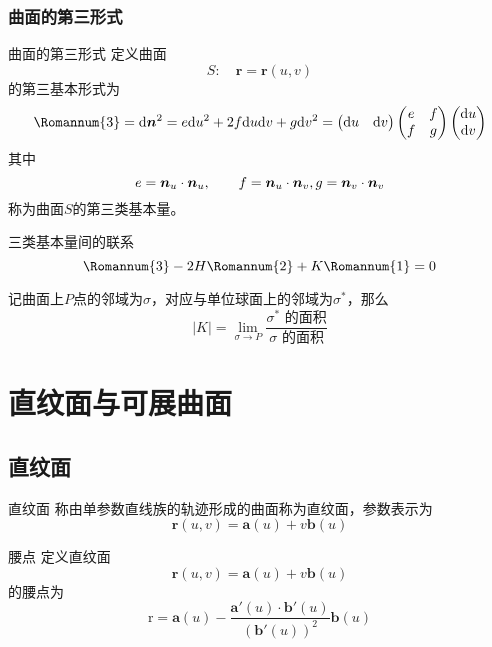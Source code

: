 \documentclass[lang = cn, scheme = chinese, thmcnt = section]{elegantbook}
\newcommand{\bs}{\boldsymbol}          %
\newcommand{\dd}{\mathrm{d}}           %
\begin{document}
\subsubsection{曲面的第三形式}

\begin{definition}{曲面的第三形式}
	定义曲面
	$$
	S:\quad \bs{r}=\bs{r}(u,v)
	$$
	的第三基本形式为%
	$$
	{\rm\Romannum{3}}
	=\dd\bs{n}^2
	=e\dd u^2+2f\dd u\dd v+g\dd v^2=
	\begin{pmatrix}
		\dd u & \dd v
	\end{pmatrix}
	\begin{pmatrix}
		e & f\\
		f & g
	\end{pmatrix}
	\begin{pmatrix}
		\dd u \\ \dd v
	\end{pmatrix}
	$$
	其中%
	$$
	e=\bs{n}_u\cdot\bs{n}_u,\qquad
	f=\bs{n}_u\cdot\bs{n}_v,\qquad \\
	g=\bs{n}_v\cdot\bs{n}_v
	$$
	称为曲面$S$的第三类基本量。
\end{definition}

\begin{theorem}{三类基本量间的联系}
	$$
	{\rm\Romannum{3}}-2H{\rm\Romannum{2}}+K{\rm\Romannum{1}}=0
	$$
\end{theorem}

\begin{proposition}
	记曲面上$P$点的邻域为$\sigma$，对应与单位球面上的邻域为$\sigma^*$，那么%
	$$
	|K|=\lim_{\sigma\to P}\frac{\sigma^*\text{ 的面积}}{\sigma\text{ 的面积}}
	$$
\end{proposition}

\section{直纹面与可展曲面}

\subsection{直纹面}

\begin{definition}{直纹面}
	称由单参数直线族的轨迹形成的曲面称为直纹面，参数表示为%
	$$
	\bs{r}(u,v)=\bs{a}(u)+v\bs{b}(u)
	$$
\end{definition}

\begin{definition}{腰点}
	定义直纹面
	$$
	\bs{r}(u,v)=\bs{a}(u)+v\bs{b}(u)
	$$
	的腰点为%
	$$
	\text{r}=\bs{a}(u)-\frac{\bs{a}'(u)\cdot\bs{b}'(u)}{(\bs{b}'(u))^2}\bs{b}(u)
	$$
\end{definition}
\end{document}
